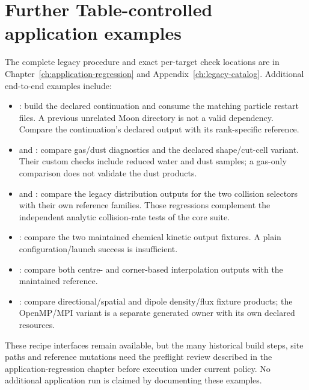 \section{Further Table-controlled application examples}
The complete legacy procedure and exact per-target check locations are in
Chapter~\ref{ch:application-regression} and
Appendix~\ref{ch:legacy-catalog}. Additional end-to-end examples include:
\begin{itemize}
\item {}: build the declared continuation and consume
the matching  particle restart files. A previous unrelated
Moon directory is not a valid dependency. Compare the continuation's
declared output with its rank-specific reference.
\item {} and
: compare gas/dust diagnostics and the
declared shape/cut-cell variant. Their custom checks include reduced water
and dust samples; a gas-only comparison does not validate the dust products.
\item {} and :
compare the legacy distribution outputs for the two collision selectors
with their own reference families. Those regressions complement the
independent analytic collision-rate tests of the core suite.
\item {}: compare the two maintained chemical
kinetic output fixtures. A plain configuration/launch success is insufficient.
\item {}: compare both centre- and
corner-based interpolation outputs with the maintained reference.
\item {}: compare directional/spatial and
dipole density/flux fixture products; the OpenMP/MPI variant is a separate
generated owner with its own declared resources.
\end{itemize}
These recipe interfaces remain available, but the many historical build
steps, site paths and reference mutations need the preflight review described
in the application-regression chapter before execution under current policy.
No additional application run is claimed by documenting these examples.
